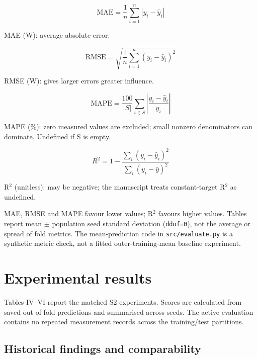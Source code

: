 \documentclass[10pt,journal,twoside]{IEEEtran}
\begin{document}
\begin{equation}\mathrm{MAE}=\frac{1}{n}\sum_{i=1}^{n}|y_i-\hat y_i|\end{equation}

{\footnotesize MAE (W): average absolute error.\par}

\begin{equation}\mathrm{RMSE}=\sqrt{\frac{1}{n}\sum_{i=1}^{n}(y_i-\hat y_i)^2}\end{equation}

{\footnotesize RMSE (W): gives larger errors greater influence.\par}

\begin{equation}\mathrm{MAPE}=\frac{100}{|S|}\sum_{i\in S}\left|\frac{y_i-\hat y_i}{y_i}\right|\end{equation}

{\footnotesize MAPE (\%): zero measured values are excluded; small nonzero denominators can dominate. Undefined if S is empty.\par}

\begin{equation}R^2=1-\frac{\sum_i(y_i-\hat y_i)^2}{\sum_i(y_i-\bar y)^2}\end{equation}

{\footnotesize R$^2$ (unitless): may be negative; the manuscript treats constant-target R$^2$ as undefined.\par}

MAE, RMSE and MAPE favour lower values; R$^2$ favours higher values. Tables report mean $\pm$ population seed standard deviation (\texttt{ddof=0}), not the average or spread of fold metrics. The mean-prediction code in \texttt{src/evaluate.py} is a synthetic metric check, not a fitted outer-training-mean baseline experiment.

\section{Experimental results}

Tables IV--VI report the matched S2 experiments. Scores are calculated from saved out-of-fold predictions and summarised across seeds. The active evaluation contains no repeated measurement records across the training/test partitions.

\subsection{Historical findings and comparability}
\end{document}
